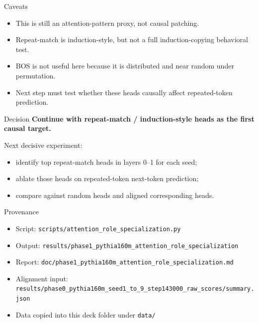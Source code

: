 \documentclass[aspectratio=169]{beamer}
\begin{document}
\begin{frame}{Caveats}
  \begin{itemize}
    \item This is still an attention-pattern proxy, not causal patching.
    \item Repeat-match is induction-style, but not a full induction-copying behavioral test.
    \item BOS is not useful here because it is distributed and near random under permutation.
    \item Next step must test whether these heads causally affect repeated-token prediction.
  \end{itemize}
\end{frame}

\begin{frame}{Decision}
  \textbf{Continue with repeat-match / induction-style heads as the first causal target.}

  \vspace{0.8em}
  Next decisive experiment:
  \begin{itemize}
    \item identify top repeat-match heads in layers 0--1 for each seed;
    \item ablate those heads on repeated-token next-token prediction;
    \item compare against random heads and aligned corresponding heads.
  \end{itemize}
\end{frame}

\begin{frame}{Provenance}
  \begin{itemize}
    \item Script: \texttt{scripts/attention\_role\_specialization.py}
    \item Output: \texttt{results/phase1\_pythia160m\_attention\_role\_specialization}
    \item Report: \texttt{doc/phase1\_pythia160m\_attention\_role\_specialization.md}
    \item Alignment input: \texttt{results/phase0\_pythia160m\_seed1\_to\_9\_step143000\_raw\_scores/summary.json}
    \item Data copied into this deck folder under \texttt{data/}
  \end{itemize}
\end{frame}
\end{document}
